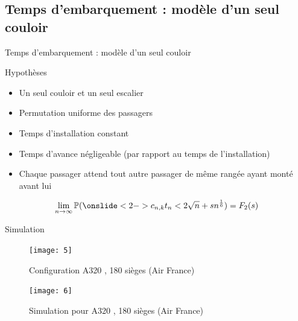 \documentclass[french]{beamer}
\begin{document}
\subsection{Temps d'embarquement :  modèle d'un seul couloir}
\begin{frame}{Temps d’embarquement : modèle d'un seul couloir }
\begin{block}{Hypothèses}
\begin{itemize}
\item<1-2> Un seul couloir et  un seul escalier  
\item<1-2> Permutation uniforme des passagers
\item<1-2> Temps d'installation constant 
\item<1-2> Temps d'avance négligeable (par rapport au temps  de l'installation)
\item<2> Chaque passager attend tout autre passager de même rangée ayant monté avant  lui 
\end{itemize}
\end{block}
\begin{align*}
\lim_{n\to \infty}
\mathbb{P}( \onslide<2->{c_{n,k}}t_n <2\sqrt{n}+sn^\frac 1 6) = F_2(s)  
\end{align*}
\end{frame}
\begin{frame}{Simulation}
\begin{figure}[ht]
    \centering
  \texttt{[image: 5]}
\caption {Configuration A320 , 180 sièges (Air France)}
\end{figure}
\begin{figure}[ht]
    \centering
  \texttt{[image: 6]}
\caption {Simulation pour A320 , 180 sièges (Air France)  }
\end{figure}
\end{frame}
\end{document}
